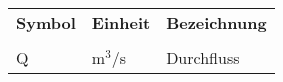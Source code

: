 \begin{longtable}{p{15mm} p{20mm} p{110mm}}
\textbf{Symbol}&\textbf{Einheit}&\textbf{Bezeichnung}\\
& & \\
\endhead
Q&m$^{3}$/s&Durchfluss\\
\end{longtable}

